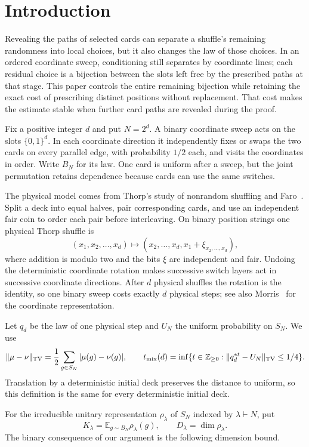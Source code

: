 \section{Introduction}

Revealing the paths of selected cards can separate a shuffle's remaining
randomness into local choices, but it also changes the law of those choices.
In an ordered coordinate sweep, conditioning still separates by coordinate
lines; each residual choice is a bijection between the slots left free by the
prescribed paths at that stage. This paper controls the entire remaining bijection while
retaining the exact cost of prescribing distinct positions without
replacement. That cost makes the estimate stable when further card paths
are revealed during the proof.

Fix a positive integer \(d\) and put \(N=2^d\). A binary coordinate sweep
acts on the slots \(\{0,1\}^d\). In each coordinate direction it
independently fixes or swaps the two cards on every parallel edge, with
probability \(1/2\) each, and visits the coordinates in order. Write \(B_N\)
for its law. One card is uniform after a sweep, but the joint permutation
retains dependence because cards can use the same switches.

The physical model comes from Thorp's study of nonrandom shuffling and
Faro~\cite{Thorp1973}. Split a deck into equal halves, pair corresponding
cards, and use an independent fair coin to order each pair before
interleaving. On binary position strings one physical Thorp shuffle is
\[
 (x_1,x_2,\ldots,x_d)\longmapsto
 (x_2,\ldots,x_d,x_1+\xi_{x_2,\ldots,x_d}),
\]
where addition is modulo two and the bits \(\xi\) are independent and
fair. Undoing the deterministic coordinate rotation makes successive
switch layers act in successive coordinate directions. After \(d\)
physical shuffles the rotation is the identity, so one binary sweep costs
exactly \(d\) physical steps; see also
Morris~\cite[Section~1.1]{Morris2008} for the coordinate representation.

Let \(q_d\) be the law of one physical step and \(U_N\) the uniform
probability on \(S_N\). We use
\[
 \|\mu-\nu\|_{\mathrm{TV}}
 =\frac12\sum_{g\in S_N}|\mu(g)-\nu(g)|,\qquad
 t_{\rm mix}(d)=\inf\{t\in\mathbb Z_{\ge0}:
                 \|q_d^{*t}-U_N\|_{\mathrm{TV}}\le1/4\}.
\]
Translation by a deterministic initial deck preserves the distance to
uniform, so this definition is the same for every deterministic initial
deck.

For the irreducible unitary representation \(\rho_\lambda\) of \(S_N\)
indexed by \(\lambda\vdash N\), put
\[
 K_\lambda=\mathbb E_{g\sim B_N}\rho_\lambda(g),
 \qquad D_\lambda=\dim\rho_\lambda.
\]
The binary consequence of our argument is the following dimension bound.


